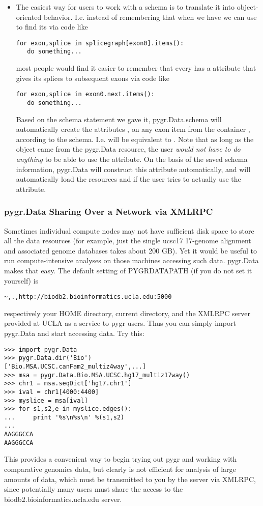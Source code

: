 \documentclass{howto}
\begin{document}
\begin{itemize}
\item The easiest way for users to work with a schema is to translate
it into object-oriented behavior.  I.e. instead of remembering that
when we have  we can use  to find its
 via code like 
\begin{verbatim}
for exon,splice in splicegraph[exon0].items():
   do something...
\end{verbatim}
most people would find it easier to remember that every 
has a  attribute that gives its splices to subsequent exons
via code like
\begin{verbatim}
for exon,splice in exon0.next.items():
   do something...
\end{verbatim}
Based on the schema statement we gave it,
pygr.Data.schema will automatically create the attributes ,
 on any exon item from the container ,
according to the schema.  I.e.  will be equivalent to
.  Note that as long as the object 
came from the pygr.Data resource, the user {\em would not have to do anything}
to be able to use the  attribute.  On the basis of the saved
schema information, pygr.Data will construct this attribute automatically,
and will automatically load the resources  and 
if the user tries to actually use the  attribute.
\end{itemize}

\subsubsection{pygr.Data Sharing Over a Network via XMLRPC}
Sometimes individual compute nodes may not have sufficient disk space to
store all the data resources (for example, just the single ucsc17 17-genome alignment and 
associated genome databases takes about 200 GB).  Yet it would be useful
to run compute-intensive analyses on those machines accessing such data.
pygr.Data makes that easy.  The default setting of PYGRDATAPATH (if you
do not set it yourself) is 
\begin{verbatim}~,.,http://biodb2.bioinformatics.ucla.edu:5000\end{verbatim}
respectively your HOME directory, current directory, and the XMLRPC
server provided at UCLA as a service to pygr users.  Thus you can
simply import pygr.Data and start accessing data.  Try this:
\begin{verbatim}
>>> import pygr.Data
>>> pygr.Data.dir('Bio')
['Bio.MSA.UCSC.canFam2_multiz4way',...]
>>> msa = pygr.Data.Bio.MSA.UCSC.hg17_multiz17way()
>>> chr1 = msa.seqDict['hg17.chr1']
>>> ival = chr1[4000:4400]
>>> myslice = msa[ival]
>>> for s1,s2,e in myslice.edges():
...     print '%s\n%s\n' %(s1,s2)
...
AAGGGCCA
AAGGGCCA
\end{verbatim}
This provides a convenient way to begin trying out pygr and working
with comparative genomics data, but clearly is not efficient for analysis
of large amounts of data, which must be transmitted to you by the server
via XMLRPC, since potentially many users must share the access to the 
biodb2.bioinformatics.ucla.edu server.
\end{document}
